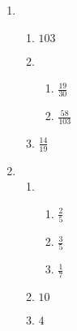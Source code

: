{\begin{multicols}{3}
\begin{enumerate}[noitemsep, label=\textbf{\arabic*}. ]
      \item %
	    \begin{enumerate}[noitemsep, label=\textbf{(\alph*)} ]
		\item $103$ %
		\item %
		    \begin{enumerate}[itemsep=1pt,  label=\textbf{\roman*}. ] 
			\item $\frac{19}{30}$%
			\item $\frac{58}{103}$%
		    \end{enumerate} 
		\item $\frac{14}{19}$%
	    \end{enumerate}

      \item %
	    \begin{enumerate}[noitemsep, label=\textbf{(\alph*)} ]
		  \item %
		      \begin{enumerate}[itemsep=1pt,  label=\textbf{\roman*}. ] 
			    \item $\frac{2}{5}$%
			    \item $\frac{3}{5}$%
			    \item $\frac{1}{7}$%
		      \end{enumerate}
		  \item $10$%
		  \item$4$ %
	    \end{enumerate}


\end{enumerate}
\end{multicols}}
